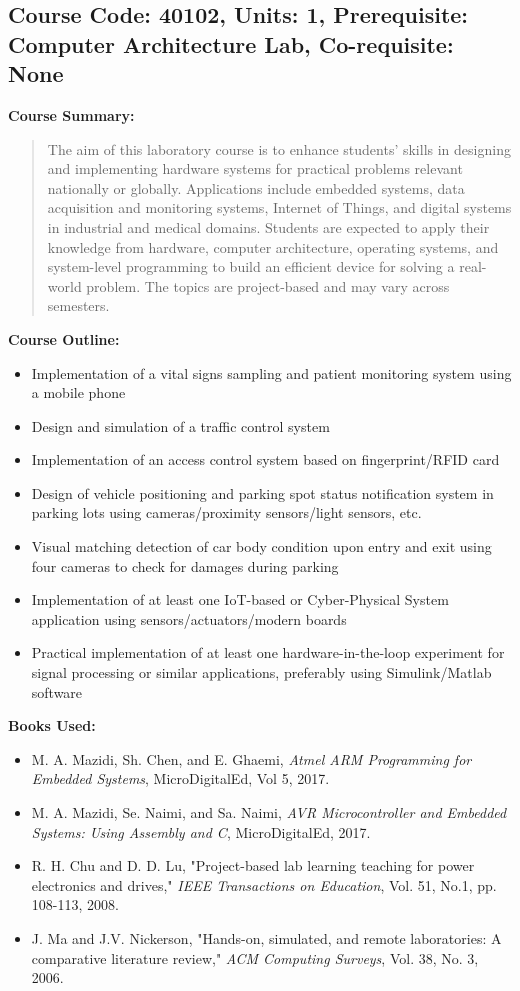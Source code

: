 \documentclass[12pt]{article}
\begin{document}
\subsection*{Course Code: 40102, Units: 1, Prerequisite: Computer Architecture Lab, Co-requisite: None}

\textbf{Course Summary:} 
\begin{quote}
The aim of this laboratory course is to enhance students' skills in designing and implementing hardware systems for practical problems relevant nationally or globally. Applications include embedded systems, data acquisition and monitoring systems, Internet of Things, and digital systems in industrial and medical domains. Students are expected to apply their knowledge from hardware, computer architecture, operating systems, and system-level programming to build an efficient device for solving a real-world problem. The topics are project-based and may vary across semesters.
\end{quote}

\textbf{Course Outline:}
\begin{itemize}
    \item Implementation of a vital signs sampling and patient monitoring system using a mobile phone
    \item Design and simulation of a traffic control system
    \item Implementation of an access control system based on fingerprint/RFID card
    \item Design of vehicle positioning and parking spot status notification system in parking lots using cameras/proximity sensors/light sensors, etc.
    \item Visual matching detection of car body condition upon entry and exit using four cameras to check for damages during parking
    \item Implementation of at least one IoT-based or Cyber-Physical System application using sensors/actuators/modern boards
    \item Practical implementation of at least one hardware-in-the-loop experiment for signal processing or similar applications, preferably using Simulink/Matlab software
\end{itemize}

\textbf{Books Used:}
\begin{itemize}
    \item M. A. Mazidi, Sh. Chen, and E. Ghaemi, \textit{Atmel ARM Programming for Embedded Systems}, MicroDigitalEd, Vol 5, 2017.
    \item M. A. Mazidi, Se. Naimi, and Sa. Naimi, \textit{AVR Microcontroller and Embedded Systems: Using Assembly and C}, MicroDigitalEd, 2017.
    \item R. H. Chu and D. D. Lu, "Project-based lab learning teaching for power electronics and drives," \textit{IEEE Transactions on Education}, Vol. 51, No.1, pp. 108-113, 2008.
    \item J. Ma and J.V. Nickerson, "Hands-on, simulated, and remote laboratories: A comparative literature review," \textit{ACM Computing Surveys}, Vol. 38, No. 3, 2006.
\end{itemize}
\end{document}
